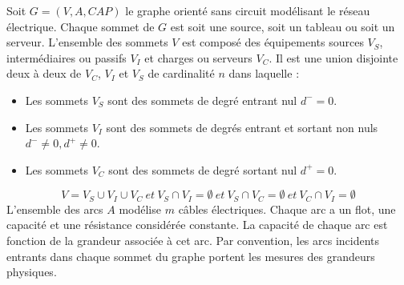 
Soit $G=(V,A,CAP)$ le graphe orient\'e sans circuit mod\'elisant le r\'eseau \'electrique. 
Chaque sommet de $G$ est soit une source, soit  un tableau ou soit un serveur. 
L'ensemble des sommets $V$ est compos\'e des \'equipements sources $V_S$, interm\'ediaires ou passifs $V_I$ et  charges ou serveurs $V_C$. Il est une union disjointe deux \`a deux  de $V_C$, $V_I$ et $V_S$ de cardinalit\'e $n$ dans laquelle :
\begin{itemize}
	\item Les sommets $V_S$ sont des sommets de degr\'e entrant nul $d^{-} = 0$.
	\item Les sommets $V_I$ sont des sommets de degr\'es entrant et sortant non nuls $d^{-} \ne 0, d^{+} \ne 0$.  
	\item Les sommets $V_C$ sont des sommets de degr\'e sortant nul  $d^{+} = 0$.
\end{itemize}
$$ 
V = V_S \cup V_I \cup V_C ~ et ~ 
V_S \cap V_I =  \emptyset ~ et ~ 
V_S \cap V_C =  \emptyset ~ et ~ 
V_C \cap V_I =  \emptyset
$$
L'ensemble des arcs $A$ mod\'elise $m$ c\^ables \'electriques.
Chaque arc a un flot, une capacit\'e et une r\'esistance consid\'er\'ee constante.
La capacit\'e de chaque arc est fonction de la grandeur associ\'ee \`a cet arc.
\newline
Par convention,  les arcs incidents entrants dans chaque sommet du graphe portent les mesures des grandeurs physiques.

